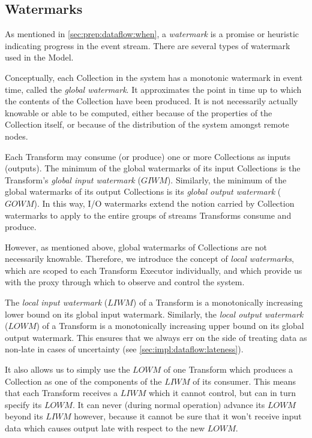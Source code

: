 \subsection{Watermarks}\label{sec:impl:dataflow:watermarks}

As mentioned in \cref{sec:prep:dataflow:when}, a \emph{watermark} is a promise or heuristic indicating progress in the event stream.
There are several types of watermark used in the Model.

Conceptually, each Collection in the system has a monotonic watermark in event time, called the \emph{global watermark}.
It approximates the point in time up to which the contents of the Collection have been produced.
It is not necessarily actually knowable or able to be computed, either because of the properties of the Collection itself, or because of the distribution of the system amongst remote nodes.

Each Transform may consume (or produce) one or more Collections as inputs (outputs).
The minimum of the global watermarks of its input Collections is the Transform's \emph{global input watermark} ($\mathit{GIWM}$).
Similarly, the minimum of the global watermarks of its output Collections is its \emph{global output watermark} ($\mathit{GOWM}$).
In this way, I/O watermarks extend the notion carried by Collection watermarks to apply to the entire groups of streams Transforms consume and produce.

However, as mentioned above, global watermarks of Collections are not necessarily knowable.
Therefore, we introduce the concept of \emph{local watermarks}, which are scoped to each Transform Executor individually, and which provide us with the proxy through which to observe and control the system.

The \emph{local input watermark} ($\mathit{LIWM}$) of a Transform is a monotonically increasing lower bound on its global input watermark.
Similarly, the \emph{local output watermark} ($\mathit{LOWM}$) of a Transform is a monotonically increasing upper bound on its global output watermark.
This ensures that we always err on the side of treating data as non-late in cases of uncertainty (see \cref{sec:impl:dataflow:lateness}).

It also allows us to simply use the $\mathit{LOWM}$ of one Transform which produces a Collection as one of the components of the $\mathit{LIWM}$ of its consumer.
This means that each Transform receives a $\mathit{LIWM}$ which it cannot control, but can in turn specify its $\mathit{LOWM}$.
It can never (during normal operation\footnotemark) advance its $\mathit{LOWM}$ beyond its $\mathit{LIWM}$ however, because it cannot be sure that it won't receive input data which causes output late with respect to the new $\mathit{LOWM}$.

